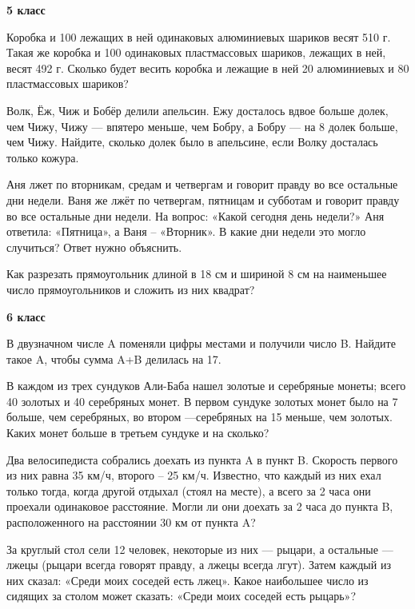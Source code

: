 \centerline{\bf \Huge 5 класс}

\textbf{}

 Коробка и 100 лежащих в ней одинаковых алюминиевых
шариков весят 510 г. Такая же коробка и 100 одинаковых пластмассовых шариков, лежащих в ней, весят 492 г. Сколько будет весить коробка и лежащие в ней 20 алюминиевых и 80 пластмассовых шариков? 

 Волк, Ёж, Чиж и Бобёр делили апельсин. Ежу досталось вдвое больше долек, чем Чижу, Чижу — впятеро меньше, чем Бобру, а Бобру — на 8 долек больше, чем Чижу. Найдите, сколько долек было в апельсине, если Волку досталась только кожура.

 Аня лжет по вторникам, средам и четвергам и говорит правду во все остальные дни недели. Ваня же лжёт по четвергам, пятницам и субботам и говорит правду во все остальные дни недели. На вопрос: «Какой сегодня день недели?» Аня ответила: «Пятница», а Ваня – «Вторник». В какие дни недели это могло случиться? Ответ нужно объяснить.

 Как разрезать прямоугольник длиной в 18 см и шириной 8 см на наименьшее число прямоугольников и сложить из них квадрат?

\newpage

\centerline{\bf \Huge 6 класс}

\textbf{}

 В двузначном числе A поменяли цифры местами и получили число B. Найдите такое A, чтобы сумма A+B делилась на 17.

 В каждом из трех сундуков Али-Баба нашел золотые и серебряные монеты; всего 40 золотых и 40 серебряных монет. В первом сундуке золотых монет было на 7 больше, чем серебряных, во втором —серебряных на 15 меньше, чем золотых. Каких монет больше в третьем сундуке и на сколько?

 Два велосипедиста собрались доехать из пункта A в пункт B. Скорость первого из них равна 35 км/ч, второго – 25 км/ч. Известно, что каждый из них ехал только тогда, когда другой отдыхал (стоял на месте), а всего за 2 часа они проехали одинаковое расстояние. Могли ли они доехать за 2 часа до пункта B, расположенного на расстоянии 30 км от пункта A?

 За круглый стол сели 12 человек, некоторые из них — рыцари, а остальные — лжецы (рыцари всегда говорят правду, а лжецы всегда лгут). Затем каждый из них сказал: «Среди моих соседей есть лжец». Какое наибольшее число из сидящих за столом может сказать: «Среди моих соседей есть рыцарь»?

